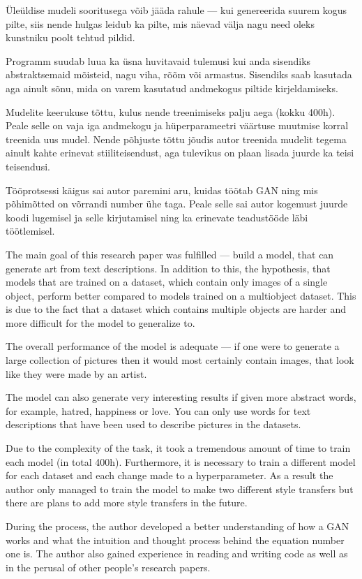 \documentclass{vilgym}
\begin{document}
	Üleüldise mudeli sooritusega võib jääda rahule --- kui genereerida suurem kogus pilte, siis nende hulgas leidub ka pilte, mis näevad välja nagu need oleks kunstniku poolt tehtud pildid. 

	Programm suudab luua ka üsna huvitavaid tulemusi kui anda sisendiks abstraktsemaid mõisteid, nagu viha, rõõm või armastus. Sisendiks saab kasutada aga ainult sõnu, mida on varem kasutatud andmekogus piltide kirjeldamiseks.
	
	Mudelite keerukuse tõttu, kulus nende treenimiseks palju aega (kokku 400h). Peale selle on vaja iga andmekogu ja hüperparameetri väärtuse muutmise korral treenida uus mudel. Nende põhjuste tõttu jõudis autor treenida mudelit tegema ainult kahte erinevat stiiliteisendust, aga tulevikus on plaan lisada juurde ka teisi teisendusi.

	Tööprotsessi käigus sai autor paremini aru, kuidas töötab GAN ning mis põhimõtted on võrrandi number ühe taga. Peale selle sai autor kogemust juurde koodi lugemisel ja selle kirjutamisel ning ka erinevate teadustööde läbi töötlemisel.

    The main goal of this research paper was fulfilled --- build a model, that can generate art from text descriptions. In addition to this, the hypothesis, that models that are trained on a dataset, which contain only images of a single object, perform better compared to models trained on a multiobject dataset. This is due to the fact that a dataset which contains multiple objects are harder and more difficult for the model to generalize to.
    
    The overall performance of the model is adequate --- if one were to generate a large collection of pictures then it would most certainly contain images, that look like they were made by an artist.

    The model can also generate very interesting results if given more abstract words, for example, hatred, happiness or love. You can only use words for text descriptions that have been used to describe pictures in the datasets.

    Due to the complexity of the task, it took a tremendous amount of time to train each model (in total 400h). Furthermore, it is necessary to train a different model for each dataset and each change made to a hyperparameter. As a result the author only managed to train the model to make two different style transfers but there are plans to add more style transfers in the future.
    
    During the process, the author developed a better understanding of how a GAN works and what the intuition and thought process behind the equation number one is. The author also gained experience in reading and writing code as well as in the perusal of other people's research papers.
	\nocite{*} %
	\printbibliography[title={Kasutatud allikad}]
\end{document}
